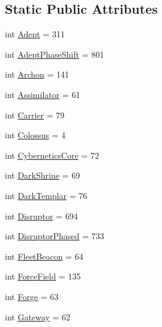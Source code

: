 \subsection*{Static Public Attributes}
\begin{DoxyCompactItemize}
\item 
int \mbox{\hyperlink{classpysc2_1_1lib_1_1units_1_1_protoss_aab1e235a0b3761beea540d595cae2034}{Adept}} = 311
\item 
int \mbox{\hyperlink{classpysc2_1_1lib_1_1units_1_1_protoss_ab5094d7ed6f62bb738bedf92f351c4b0}{Adept\+Phase\+Shift}} = 801
\item 
int \mbox{\hyperlink{classpysc2_1_1lib_1_1units_1_1_protoss_ae267da492a452dd49f5cd7dae0831378}{Archon}} = 141
\item 
int \mbox{\hyperlink{classpysc2_1_1lib_1_1units_1_1_protoss_aabcc746b55deea56c1eca3ea5593c2c9}{Assimilator}} = 61
\item 
int \mbox{\hyperlink{classpysc2_1_1lib_1_1units_1_1_protoss_a93a5eecf786a58a4bc8047873081ee55}{Carrier}} = 79
\item 
int \mbox{\hyperlink{classpysc2_1_1lib_1_1units_1_1_protoss_a48533f1869b6bd8234aa93c43bf0a634}{Colossus}} = 4
\item 
int \mbox{\hyperlink{classpysc2_1_1lib_1_1units_1_1_protoss_ad96d108f1451b1afbe1d3d03c88b9a73}{Cybernetics\+Core}} = 72
\item 
int \mbox{\hyperlink{classpysc2_1_1lib_1_1units_1_1_protoss_a9c5cad74b4e6b434b9971850e0b57e27}{Dark\+Shrine}} = 69
\item 
int \mbox{\hyperlink{classpysc2_1_1lib_1_1units_1_1_protoss_ad5f624d6a0a052ff56a117e1e4628082}{Dark\+Templar}} = 76
\item 
int \mbox{\hyperlink{classpysc2_1_1lib_1_1units_1_1_protoss_a18be0f129d595f62e1ef3825ae4b3d53}{Disruptor}} = 694
\item 
int \mbox{\hyperlink{classpysc2_1_1lib_1_1units_1_1_protoss_a87a888de9350230bd59bb03965cefb56}{Disruptor\+Phased}} = 733
\item 
int \mbox{\hyperlink{classpysc2_1_1lib_1_1units_1_1_protoss_aff303012ff624cc686ce930feaadf8d2}{Fleet\+Beacon}} = 64
\item 
int \mbox{\hyperlink{classpysc2_1_1lib_1_1units_1_1_protoss_a6e30d1018cea28f6556c59622ed85190}{Force\+Field}} = 135
\item 
int \mbox{\hyperlink{classpysc2_1_1lib_1_1units_1_1_protoss_afdf8acdee3ca621917fb925ac1e18f62}{Forge}} = 63
\item 
int \mbox{\hyperlink{classpysc2_1_1lib_1_1units_1_1_protoss_a8f9a9cd47c854b51c15b16d41df33abc}{Gateway}} = 62

\end{DoxyCompactItemize}

